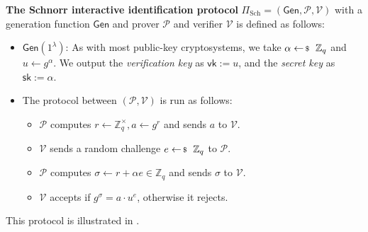\documentclass[../../book.tex]{subfiles}
\begin{document}
\begin{definition}
    \textbf{The Schnorr interactive identification protocol} $\Pi_{\text{Sch}} = (\mathsf{Gen}, \mathcal{P}, \mathcal{V})$ \cite{schnorr1989} with a generation function $\mathsf{Gen}$ and prover $\mathcal{P}$ and verifier $\mathcal{V}$ is defined as follows:
    \begin{itemize}
        \item $\mathsf{Gen}(1^{\lambda})$: As with most public-key cryptosystems, we take $\alpha \leftarrowS \mathbb{Z}_q$ and $u \gets g^{\alpha}$. We output the \textit{verification key} as $\mathsf{vk} := u$, and the \textit{secret key} as $\mathsf{sk} := \alpha$.
        \item The protocol between $(\mathcal{P},\mathcal{V})$ is run as follows:
        \begin{itemize}
            \item $\mathcal{P}$ computes $r \gets \mathbb{Z}_q^{\times}, a \gets g^{r}$ and sends $a$ to $\mathcal{V}$.
            \item $\mathcal{V}$ sends a random challenge $e \leftarrowS \mathbb{Z}_q$ to $\mathcal{P}$.
            \item $\mathcal{P}$ computes $\sigma \gets r + \alpha e \in \mathbb{Z}_q$ and sends $\sigma$ to $\mathcal{V}$.
            \item $\mathcal{V}$ accepts if $g^{\sigma} = a \cdot u^e$, otherwise it rejects.
        \end{itemize}
    \end{itemize}

    This protocol is illustrated in . 
\end{definition}
\end{document}
